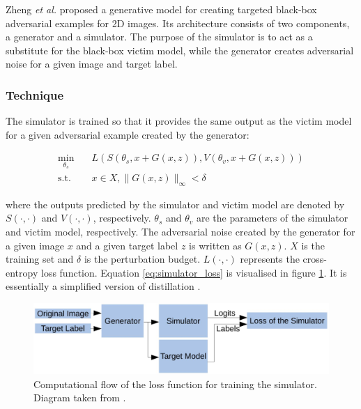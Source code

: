 Zheng \textit{et al.} \cite{zheng_black_box_GAN} proposed a generative model for creating targeted black-box adversarial examples for 2D images. Its architecture consists of two components, a generator and a simulator. The purpose of the simulator is to act as a substitute for the black-box victim model, while the generator creates adversarial noise for a given image and target label.

\subsubsection{Technique}

The simulator is trained so that it provides the same output as the victim model for a given adversarial example created by the generator:

\begin{equation}
\begin{aligned}
\min_{\theta_s} \quad & L(S(\theta_s, x + G(x, z)),V(\theta_v, x + G(x, z)))\\
\textrm{s.t.} \quad & x \in X, \|G(x, z)\|_\infty < \delta
\label{eq:simulator_loss}
\end{aligned}
\end{equation}

\noindent where the outputs predicted by the simulator and victim model are denoted by $S(\cdot,\cdot)$ and $V(\cdot,\cdot)$, respectively. $\theta_s$ and $\theta_v$ are the parameters of the simulator and victim model, respectively. The adversarial noise created by the generator for a given image $x$ and a given target label $z$ is written as $G(x,z)$. $X$ is the training set and $\delta$ is the perturbation budget. $L(\cdot,\cdot)$ represents the cross-entropy loss function. Equation \ref{eq:simulator_loss} is visualised in figure \ref{fig:zheng_simulator_loss}. It is essentially a simplified version of distillation \cite{distillation}.

\begin{figure}[ht]
    \centering
    \includegraphics[width=1\textwidth]{graphics/simulator_loss.JPG}
    \caption{Computational flow of the loss function for training the simulator. Diagram taken from \cite{zheng_black_box_GAN}.}
    \label{fig:zheng_simulator_loss}
\end{figure}

